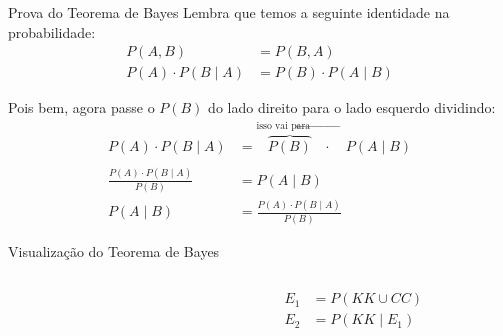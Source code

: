 \begin{frame}{Prova do Teorema de Bayes}
    Lembra que temos a seguinte identidade na probabilidade:
    $$
    \begin{aligned}
    P(A,B) &= P(B,A) \\
    P(A) \cdot P(B \mid A) &= P(B) \cdot P(A \mid B)
    \end{aligned}
    $$

    Pois bem, agora passe o $P(B)$ do lado direito para o lado esquerdo dividindo:
    $$
    \begin{aligned}
    P(A) \cdot P(B \mid A) &= \overbrace{P(B)}^{\text{isso vai para $\leftarrow$}} \cdot \quad P(A \mid B) \\
    &\\
    \frac{P(A) \cdot P(B \mid A)}{P(B)} &= P(A \mid B) \\
    P(A \mid B) &= \frac{P(A) \cdot P(B \mid A)}{P(B)}
    \end{aligned}
    $$
\end{frame}

\begin{frame}{Visualização do Teorema de Bayes}
    \begin{columns}
        \begin{column}{0.6\textwidth}
        \end{column}
        \begin{column}{0.4\textwidth}
            $$
            \begin{aligned}
                E_1 &= P(KK  \cup CC) \\
                E_2 &= P(KK \mid E_1)
            \end{aligned}
            $$
        \end{column}
    \end{columns}
\end{frame}

